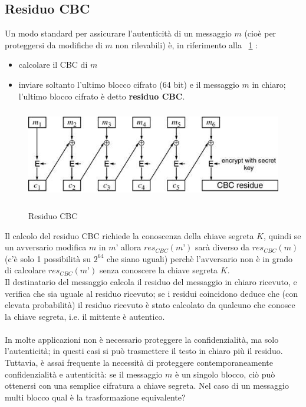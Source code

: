 \subsection{Residuo CBC}
Un modo standard per assicurare l'autenticità di un messaggio $m$ (cioè per proteggersi da modifiche di $m$ non rilevabili) è, in riferimento alla \figurename ~\ref{fig:residuo_CBC} :
\begin{itemize}
\item calcolare il CBC di $m$
\item inviare soltanto l'ultimo blocco cifrato (64 bit) e il messaggio $m$ in chiaro; l'ultimo blocco cifrato è detto \textbf{residuo CBC}.
\end{itemize}
\begin{figure}[htbp]
	\centering%
	\subfigure%
	{\includegraphics[height=4cm, width=12cm, keepaspectratio]{Immagini/Capitolo3/residuo_CBC.png}}
	\caption{Residuo CBC \label{fig:residuo_CBC}} 	
\end{figure}
Il calcolo del residuo CBC richiede la conoscenza della chiave segreta $K$, quindi se un avversario modifica $m$ in $m’$ allora $res_{CBC}(m’)$ sarà diverso da $res_{CBC}(m)$ (c'è solo 1 possibilità su $2^64$ che siano uguali) perchè l'avversario non è in grado di calcolare $res_{CBC}(m’)$ senza conoscere la chiave segreta $K$. \\
Il destinatario del messaggio calcola il residuo del messaggio in chiaro ricevuto, e verifica che sia uguale al residuo ricevuto; se i residui coincidono deduce che (con elevata probabilità) il residuo ricevuto è stato calcolato da qualcuno che conosce la chiave segreta, i.e. il mittente è autentico.\\
\\
In molte applicazioni non è necessario proteggere la confidenzialità, ma solo l'autenticità; in questi casi si può trasmettere il testo in chiaro più il residuo. Tuttavia, è assai frequente la necessità di
proteggere contemporaneamente confidenzialità e autenticità: se il messaggio $m$ è un singolo blocco, ciò può ottenersi con una semplice cifratura a chiave segreta. Nel caso di un messaggio multi blocco qual è la
trasformazione equivalente?
